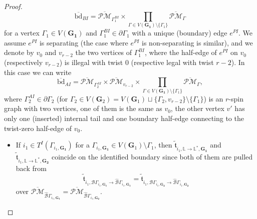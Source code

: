 \documentclass[11pt]{amsart}
\theoremstyle{definition}
\theoremstyle{remark}
\newcommand{\oPMb}{{\overline{\mathcal{PM}}}}
\newcommand{\<}{\left<}
\renewcommand{\>}{\right>}
\numberwithin{equation}{section}
\begin{document}
\begin{proof}
        $$\overline{\text{bd}}_{BI}=\oPMb_{\Gamma_1^{BI}}\times \prod_{\Gamma\in V(\mathbf{G_1})\setminus\{\Gamma_1\}}\oPMb_{\Gamma}$$
        for a vertex $\Gamma_1\in V(\mathbf{G_1})$ and $\Gamma^{BI}_1\in \partial \Gamma_1$ with a unique (boundary) edge $e^{PI}$. We assume $e^{PI}$ is separating  (the case where $e^{PI}$ is non-separating is similar), and we denote by $v_0$ and $v_{r-2}$ the two vertices of $\Gamma_1^{BI}$, where the half-edge of $e^{PI}$ on $v_0$ (respectively $v_{r-2}$) is illegal with twist $0$ (respective legal with twist $r-2$). In this case we can write
        $$\overline{\text{bd}}_{AI}=\oPMb_{\Gamma_2^{AI}}\times \oPMb_{v_{r-2}}\times  \prod_{\Gamma\in V(\mathbf{G_1})\setminus\{\Gamma_1\}}\oPMb_{\Gamma},$$
        where $\Gamma_2^{AI}\in \partial \Gamma_2$ (for $\Gamma_2\in V(\bm{G}_2)=V(\bm{G}_1)\sqcup \{\Gamma_2,v_{r-2}\}\setminus \{\Gamma_1\}$) is an $r$-spin graph with two vertices, one of them is the same as $v_0$, the other vertex $v'$ has only one (inserted) internal tail and one boundary half-edge connecting to the twist-zero half-edge of $v_0$. 
        \begin{itemize}
            \item[-]
        If $i_1\in T^I(\Gamma_{i_1,\mathbf{G_1}})$ for a $\Gamma_{i_1,\mathbf{G_1}}\in V(\mathbf{G}_1)\setminus{\Gamma_1}$, then $\tilde{\mathfrak{t}}_{i_1,\mathbb L \to \mathbb L^*,\mathbf{G_1}}$ and $\tilde{\mathfrak{t}}_{i_1,\mathbb L \to \mathbb L^*,\mathbf{G_2}}$ coincide on the identified boundary since both of them are pulled back from 
        $$\tilde{\mathfrak t}_{i_1,{\mathcal B}\Gamma_{i_1,\bm{G_1}}\to\hat{\mathcal B}\Gamma_{i_1,\bm{G_1}}}=\tilde{\mathfrak t}_{i_1,{\mathcal B}\Gamma_{i_1,\bm{G_2}}\to\hat{\mathcal B}\Gamma_{i_1,\bm{G_2}}}$$
        over $\oPMb_{\hat{\mathcal B}\Gamma_{i_1,\bm{G_1}}}=\oPMb_{\hat{\mathcal B}\Gamma_{i_1,\bm{G_2}}}$.
        

\end{itemize}
\end{proof}
\end{document}
